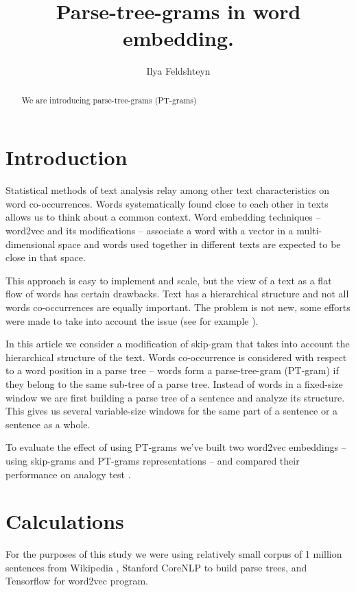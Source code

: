 \documentclass[12pt]{article}
\title{Parse-tree-grams in word embedding.}
\author{Ilya Feldshteyn}
\begin{document}
\maketitle

\begin{abstract}
We are introducing parse-tree-grams (PT-grams)
\end{abstract}


\section{Introduction}

Statistical methods of text analysis relay among other
text characteristics on word co-occurrences.
Words systematically found close to each other in texts
allows us to think about a common context. Word
embedding techniques -- word2vec and its modifications --
associate a word with a vector in a multi-dimensional
space and words used together in different texts are
expected to be close in that space.

This approach is easy to implement and scale,
but the view of a text as a flat flow of words has
certain drawbacks. Text has a hierarchical structure
and not all words co-occurrences are equally important.
The problem is not new, some efforts were made to take
into account the issue
(see for example \cite{DBLP:journals/corr/AvrahamG17}).

In this article we consider a modification of
skip-gram that takes into account the hierarchical structure of the
text. Words co-occurrence is considered with respect to a
word position in a parse tree -- words form a parse-tree-gram
(PT-gram) if they belong to the same sub-tree of a parse tree.
Instead of words in a fixed-size window we are first building
a parse tree of a sentence and analyze its structure. This gives
us several variable-size windows for the same part of a sentence
or a sentence as a whole.

To evaluate the effect of using PT-grams we've built
two word2vec embeddings -- using skip-grams and PT-grams representations --
and compared their performance on analogy test
\cite{DBLP:journals/corr/abs-1301-3781}.

\section{Calculations}

For the purposes of this study we were using relatively small
corpus of 1 million sentences from Wikipedia \cite{leipzigcorpora},
Stanford CoreNLP \cite{corenlp} to build parse trees, and
Tensorflow \cite{tensorflow} for word2vec program.
\end{document}
